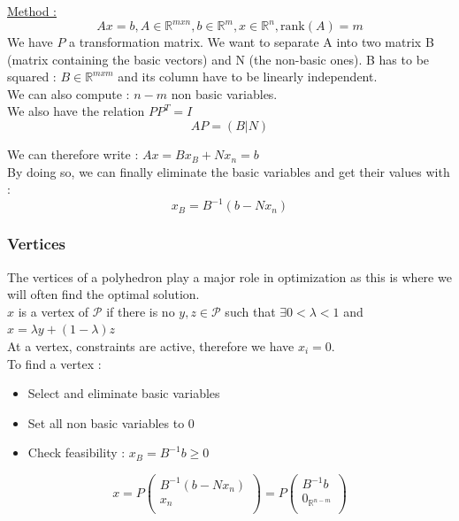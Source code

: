 \documentclass[../main.tex]{subfiles}
\begin{document}
\quad \underline{Method :}\\
\begin{equation}
    Ax=b, A\in \mathbb{R}^{mxn}, b\in \mathbb{R}^m, x\in \mathbb{R}^n, \text{rank}(A)=m
\end{equation}
We have $P$ a transformation matrix. We want to separate A into two matrix B (matrix containing the basic vectors) and N (the non-basic ones). B has to be squared : $B \in \mathbb{R}^{mxm}$ and its column have to be linearly independent.\\
We can also compute : $n-m$ non basic variables.\\
We also have the relation $PP^T = I$\\
\begin{equation}
    AP = (B|N)
\end{equation}

We can therefore write : $Ax = Bx_B + Nx_n = b$\\
By doing so, we can finally eliminate the basic variables and get their values with : \begin{equation}
    x_B = B^{-1} (b-Nx_n)
\end{equation}

\subsubsection{Vertices}
The vertices of a polyhedron play a major role in optimization as this is where we will often find the optimal solution.\\

$x$ is a vertex of $\mathcal{P}$ if there is no $y,z\in \mathcal{P}$ such that $\exists 0<\lambda<1$ and $x=\lambda y+ (1-\lambda)z$\\

At a vertex, constraints are active, therefore we have $x_i=0$. \\
To find a vertex : \begin{itemize}
    \item Select and eliminate basic variables\\
    \item Set all non basic variables to 0\\
    \item Check feasibility : $x_B = B^{-1}b \geq 0$\\
\end{itemize}

\begin{equation}
    x = P\begin{pmatrix}
        B^{-1}(b-Nx_n)\\
        x_n\\
    \end{pmatrix} = P \begin{pmatrix}
        B^{-1}b\\
        0_{\mathbb{R}^{n-m}}\\
    \end{pmatrix}
\end{equation}
\end{document}
